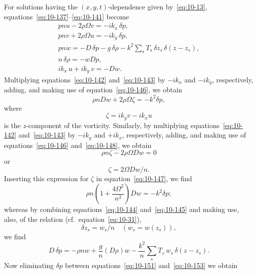 For solutions having the $(x,y,t)$-dependence given by~\eqref{eq:10-13}, equations~\eqref{eq:10-137}--\eqref{eq:10-141} become
\begin{gather}
pnu - 2\rho\Omega v = -ik_x\,\delta p, \label{eq:10-142}\\
pnv + 2\rho\Omega u = -ik_y\,\delta p, \label{eq:10-143}\\
pnw = -D\,\delta p - g\,\delta\rho - k^2\sum_s T_s\,\delta z_s\,\delta(z-z_s), \label{eq:10-144}\\
n\,\delta\rho = -wDp, \label{eq:10-145}\\
ik_x\,u + ik_y\,v = -Dw. \label{eq:10-146}
\end{gather}
Multiplying equations~\eqref{eq:10-142} and~\eqref{eq:10-143} by $-ik_x$ and $-ik_y$, respectively, adding, and making use of equation~\eqref{eq:10-146}, we obtain
\begin{equation}
\label{eq:10-147}
\rho nDw + 2\rho\Omega\zeta = -k^2\delta p,
\end{equation}
where
\begin{equation}
\label{eq:10-148}
\zeta = ik_yv - ik_xu
\end{equation}
is the $z$-component of the vorticity. Similarly, by multiplying equations~\eqref{eq:10-142} and~\eqref{eq:10-143} by $-ik_y$ and $+ik_x$, respectively, adding, and making use of equations~\eqref{eq:10-146} and~\eqref{eq:10-148}, we obtain
\begin{equation}
\label{eq:10-149}
\rho n\zeta - 2\rho\Omega Dw = 0
\end{equation}
or
\begin{equation}
\label{eq:10-150}
\zeta = 2\Omega Dw/n.
\end{equation}
Inserting this expression for $\zeta$ in equation~\eqref{eq:10-147}, we find
\begin{equation}
\label{eq:10-151}
\rho n\!\left(1+\frac{4\Omega^2}{n^2}\right)\!Dw = -k^2\delta p;
\end{equation}
whereas by combining equations~\eqref{eq:10-144} and~\eqref{eq:10-145} and making use, also, of the relation (cf.\ equation~\eqref{eq:10-31}),
\begin{equation}
\label{eq:10-152}
\delta z_s = w_s/n \quad (w_s = w(z_s)),
\end{equation}
we find
\begin{equation}
\label{eq:10-153}
D\,\delta p = -\rho nw + \frac{g}{n}(D\rho)w - \frac{k^2}{n}\sum_s T_s\,w_s\,\delta(z-z_s).
\end{equation}
Now eliminating $\delta p$ between equations~\eqref{eq:10-151} and~\eqref{eq:10-153} we obtain
